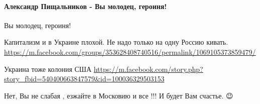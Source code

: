  
 
 
 
 

\paragraph{Александр Пищальников - Вы молодец, героиня!}

\begin{itemize}
\par
 
Вы молодец, героиня!

 
Капитализм и в Украине плохой.
Не надо только на одну Россию кивать.
\url{https://m.facebook.com/groups/353628408740516/permalink/1069105373859479/}

 
Украина тоже колония США
\url{https://m.facebook.com/story.php?story_fbid=540400663847579&id=100036329503153}

 
Нет, Вы не слабая , езжайте в Московию и все !!! И будет Вам счастье. 😉


\end{itemize}
